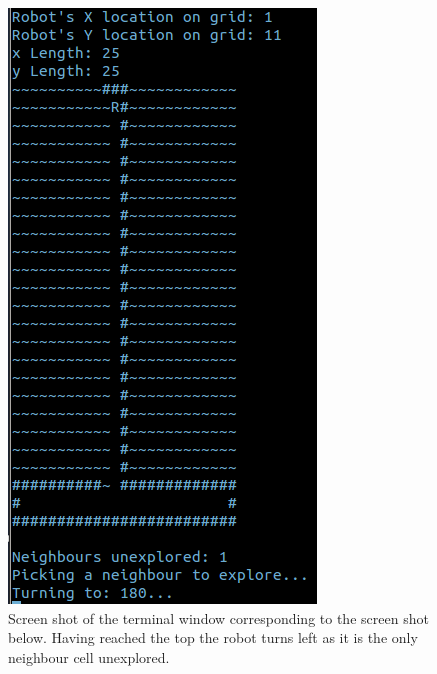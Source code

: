 \documentclass[a4paper,12pt]{article}
\begin{document}
\begin{figure}[H]
\includegraphics[scale=1.0]{RunT3.png}
\caption{Screen shot of the terminal window corresponding to the screen shot below. Having reached the top the robot turns left as it is the only neighbour cell unexplored.}
\end{figure}
\end{document}
